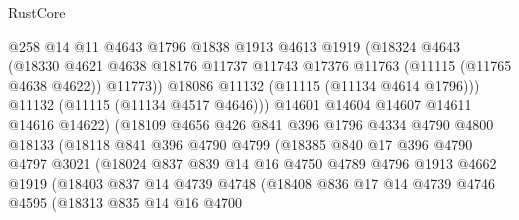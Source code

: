 \begin{lexlean}{RustCore}
\begin{coremodule}
                        @258
                        @14
                        @11
                        @4643
                        @1796
                        @1838
                        @1913
                        @4613
                        @1919
                        (@18324
                          @4643
                          (@18330
                            @4621
                            @4638
                            @18176
                            @11737
                            @11743
                            @17376
                            @11763
                            (@11115 (@11765 @4638 @4622))
                            @11773))
                        @18086
                        @11132
                        (@11115 (@11134 @4614 @1796)))
                      @11132
                      (@11115 (@11134 @4517 @4646)))
                    @14601
                    @14604
                    @14607
                    @14611
                    @14616
                    @14622)
                  (@18109
                    @4656
                    @426
                    @841
                    @396
                    @1796
                    @4334
                    @4790
                    @4800
                    @18133
                    (@18118
                      @841
                      @396
                      @4790
                      @4799
                      (@18385
                        @840
                        @17
                        @396
                        @4790
                        @4797
                        @3021
                        (@18024
                          @837
                          @839
                          @14
                          @16
                          @4750
                          @4789
                          @4796
                          @1913
                          @4662
                          @1919
                          (@18403
                            @837
                            @14
                            @4739
                            @4748
                            (@18408
                              @836
                              @17
                              @14
                              @4739
                              @4746
                              @4595
                              (@18313
                                @835
                                @14
                                @16
                                @4700

\end{coremodule}
\end{lexlean}
